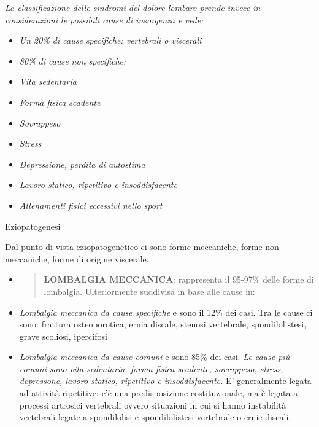 \documentclass[]{article}
\begin{document}
\emph{La classificazione delle sindromi del dolore lombare prende invece
in considerazioni le possibili cause di insorgenza e vede:}

\begin{itemize}
\item
  \emph{Un 20\% di cause specifiche: vertebrali o viscerali}
\item
  \emph{80\% di cause non specifiche: }
\end{itemize}

\begin{itemize}
\item
  \emph{Vita sedentaria}
\item
  \emph{Forma fisica scadente}
\item
  \emph{Sovrappeso}
\item
  \emph{Stress}
\item
  \emph{Depressione, perdita di autostima}
\item
  \emph{Lavoro statico, ripetitivo e insoddisfacente}
\item
  \emph{Allenamenti fisici eccessivi nello sport }
\end{itemize}

Eziopatogenesi

Dal punto di vista eziopatogenetico ci sono forme meccaniche, forme non
meccaniche, forme di origine viscerale.

\begin{itemize}
\item
  \begin{quote}
  \textbf{LOMBALGIA MECCANICA}: rappresenta il 95-97\% delle forme di
  lombalgia. Ulteriormente suddivisa in base alle cause in:
  \end{quote}
\end{itemize}

\begin{itemize}
\item
  \emph{Lombalgia meccanica da cause specifiche} e sono il 12\% dei
  casi. Tra le cause ci sono: frattura osteoporotica, ernia discale,
  stenosi vertebrale, spondilolistesi, grave scoliosi, ipercifosi
\item
  \emph{Lombalgia meccanica da cause comuni} e sono 85\% dei casi.
  \emph{Le cause più comuni sono vita sedentaria, forma fisica scadente,
  sovrappeso, stress, depressone, lavoro statico, ripetitivo e
  insoddisfacente.} E' generalmente legata ad attività ripetitive: c'è
  una predisposizione costituzionale, ma è legata a processi artrosici
  vertebrali ovvero situazioni in cui si hanno instabilità vertebrali
  legate a spondilolisi e spondilolistesi vertebrale o ernie discali.
\end{itemize}
\end{document}
